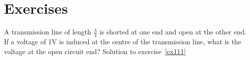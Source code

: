 \section*{Exercises}
\begin{ExerciseList}
\Exercise[label={ex111}]
A transmission line of length $\frac{\lambda}{4}$ is shorted at one end and open at the other end. If a voltage of 1V is induced at the centre of the transmission line, what is the voltage at the open circuit end?
\Answer
Solution to exercise~\ref{ex111}
\end{ExerciseList}
